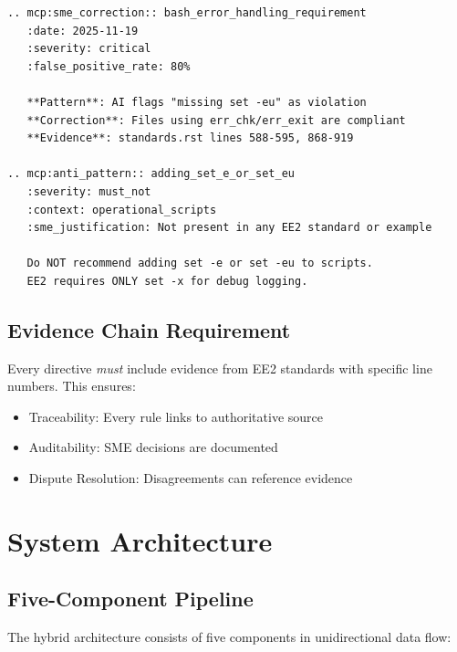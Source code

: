 \documentclass[11pt,letterpaper]{article}
\begin{document}
\begin{lstlisting}[style=rst, caption={Complete Semantic Annotation}]
.. mcp:sme_correction:: bash_error_handling_requirement
   :date: 2025-11-19
   :severity: critical
   :false_positive_rate: 80%
   
   **Pattern**: AI flags "missing set -eu" as violation
   **Correction**: Files using err_chk/err_exit are compliant
   **Evidence**: standards.rst lines 588-595, 868-919
   
.. mcp:anti_pattern:: adding_set_e_or_set_eu
   :severity: must_not
   :context: operational_scripts
   :sme_justification: Not present in any EE2 standard or example
   
   Do NOT recommend adding set -e or set -eu to scripts.
   EE2 requires ONLY set -x for debug logging.
\end{lstlisting}

\subsection{Evidence Chain Requirement}

Every directive \textit{must} include evidence from EE2 standards with specific line numbers. This ensures:
\begin{itemize}
    \item Traceability: Every rule links to authoritative source
    \item Auditability: SME decisions are documented
    \item Dispute Resolution: Disagreements can reference evidence
\end{itemize}

\section{System Architecture}

\subsection{Five-Component Pipeline}

The hybrid architecture consists of five components in unidirectional data flow:
\end{document}
